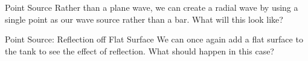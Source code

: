 \documentclass{beamer}
\begin{document}
\begin{frame}{Point Source}
    Rather than a plane wave, we can create a radial wave by using a single point as our wave source rather than a bar. What will this look like?
\end{frame}

\begin{frame}{Point Source: Reflection off Flat Surface}
We can once again add a flat surface to the tank to see the effect of reflection. What should happen in this case?
    
\end{frame}
\end{document}
